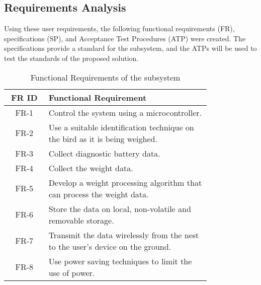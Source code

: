 \documentclass[class=report,11pt,crop=false]{standalone}
\begin{document}
\subsection*{Requirements Analysis}

Using these user requirements, the following functional requirements (FR), specifications (SP), and Acceptance Test Procedures (ATP) were created. The specifications provide a standard for the subsystem, and the ATPs will be used to test the standards of the proposed solution.

\begin{table}[h]
    {\begin{tabular}{|c|p{0.8\linewidth}|}
            \hline
            \textbf{FR ID} & \textbf{Functional Requirement}                                                \\
            \hline
            FR-1 & Control the system using a microcontroller. \\
            \hline
            FR-2 & Use a suitable identification technique on the bird as it is being weighed. \\
            \hline
            FR-3 & Collect diagnostic battery data. \\
            \hline
            FR-4 & Collect the weight data. \\
            \hline
            FR-5 & Develop a weight processing algorithm that can process the weight data. \\
            \hline
            FR-6 & Store the data on local, non-volatile and removable storage. \\
            \hline
            FR-7 & Transmit the data wirelessly from the nest to the user's device on the ground. \\
            \hline
            FR-8 & Use power saving techniques to limit the use of power. \\
            \hline
        \end{tabular}}
    \caption{Functional Requirements of the subsystem}
    \label{tab:FR}
\end{table}
\end{document}
